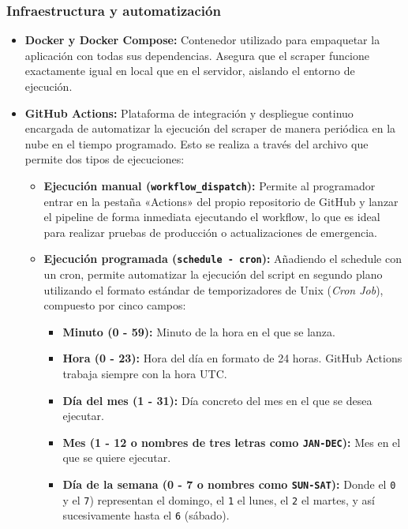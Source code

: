 \subsubsection{Infraestructura y automatización}
\begin{itemize}
    \item \textbf{Docker y Docker Compose:} Contenedor utilizado para empaquetar la aplicación con todas sus dependencias. Asegura que el scraper funcione exactamente igual en local que en el servidor, aislando el entorno de ejecución.
    \item \textbf{GitHub Actions:} Plataforma de integración y despliegue continuo encargada de automatizar la ejecución del scraper de manera periódica en la nube en el tiempo programado. Esto se realiza a través del archivo  que permite dos tipos de ejecuciones:
    \begin{itemize}
        \item \textbf{Ejecución manual (\texttt{workflow\_dispatch}):} Permite al programador entrar en la pestaña «Actions» del propio repositorio de GitHub y lanzar el pipeline de forma inmediata ejecutando el workflow, lo que es ideal para realizar pruebas de producción o actualizaciones de emergencia.
        \item \textbf{Ejecución programada (\texttt{schedule - cron}):} Añadiendo el schedule con un cron, permite automatizar la ejecución del script en segundo plano utilizando el formato estándar de temporizadores de Unix (\textit{Cron Job}), compuesto por cinco campos: 
        \begin{itemize}
            \item \textbf{Minuto (0 - 59):} Minuto de la hora en el que se lanza.
            \item \textbf{Hora (0 - 23):} Hora del día en formato de 24 horas. GitHub Actions trabaja siempre con la hora UTC.
            \item \textbf{Día del mes (1 - 31):} Día concreto del mes en el que se desea ejecutar.
            \item \textbf{Mes (1 - 12 o nombres de tres letras como \texttt{JAN-DEC}):} Mes en el que se quiere ejecutar.
            \item \textbf{Día de la semana (0 - 7 o nombres como \texttt{SUN-SAT}):} Donde el \texttt{0} y el \texttt{7}) representan el domingo, el \texttt{1} el lunes, el \texttt{2} el martes, y así sucesivamente hasta el \texttt{6} (sábado).
        \end{itemize}


\end{itemize}
\end{itemize}
